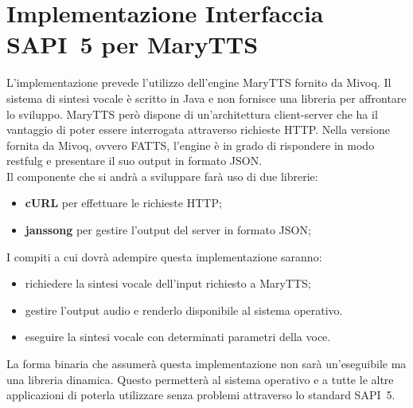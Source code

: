 \section{Implementazione Interfaccia SAPI~5 per MaryTTS}
L'implementazione prevede l'utilizzo dell'engine MaryTTS fornito da Mivoq. Il sistema di sintesi vocale è scritto in Java e non fornisce una libreria per affrontare lo sviluppo. MaryTTS però dispone di un'architettura client-server che ha il vantaggio di poter essere interrogata attraverso richieste HTTP. Nella versione fornita da Mivoq, ovvero FATTS, l'engine è in grado di rispondere in modo \gls{restfulg} e presentare il suo output in formato JSON.\\ 
Il componente che si andrà a sviluppare farà uso di due librerie:
\begin{itemize}
	\item \textbf{cURL} per effettuare le richieste HTTP;
	\item \textbf{\gls{janssong}} per gestire l'output del server in formato JSON;
\end{itemize}
I compiti a cui dovrà adempire questa implementazione saranno:
\begin{itemize}
	\item richiedere la sintesi vocale dell'input richiesto a MaryTTS;
	\item gestire l'output audio e renderlo disponibile al sistema operativo.
	\item eseguire la sintesi vocale con determinati parametri della voce.
\end{itemize}
La forma binaria che assumerà questa implementazione non sarà un'eseguibile ma una libreria dinamica. Questo permetterà al sistema operativo e a tutte le altre applicazioni di poterla utilizzare senza problemi attraverso lo standard SAPI~5.
